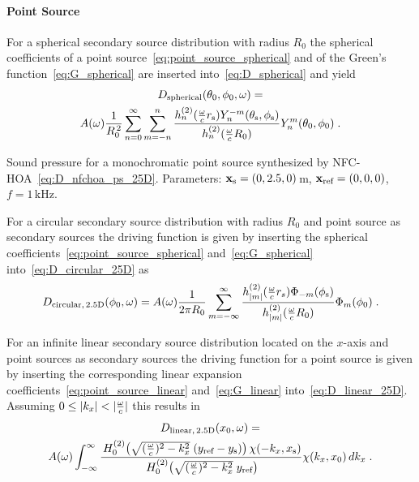 \paragraph{Point Source}
%
For a spherical secondary source distribution with radius $R_0$ the spherical
coefficients of a point source~\eqref{eq:point_source_spherical} and of the Green's
function~\eqref{eq:G_spherical} are inserted into~\eqref{eq:D_spherical} and yield
%
%
\begin{multline}
    D_\text{spherical}(\theta_0,\phi_0,\omega) = \\
    A(\omega) \frac{1}{R_0^{\,2}} \sum_{n=0}^\infty \sum_{m=-n}^n
    \frac{h_n^{(2)}(\omegac r_\text{s}) Y_n^{-m}(\theta_\text{s},\phi_\text{s})}
    {h_n^{(2)}(\omegac R_0)} Y_n^m (\theta_0,\phi_0) \qp
    \label{eq:D_nfchoa_ps_3D}
\end{multline}
%
\begin{marginfigure}
    \centering
    \ft
    
    \caption{Sound pressure for a monochromatic point source synthesized by
        \twohalfD \ac{NFC-HOA}~\eqref{eq:D_nfchoa_ps_25D}. Parameters: $\mathbf{x}_\text{s} =
        (0,2.5,0)$\,m, $\mathbf{x}_\text{ref} = (0,0,0)$, $f = 1$\,kHz.
        }
\end{marginfigure}
%
For a circular secondary source distribution with radius $R_0$ and point source
as secondary sources the \twohalfD driving function is given by inserting the
spherical coefficients~\eqref{eq:point_source_spherical} and~\eqref{eq:G_spherical}
into~\eqref{eq:D_circular_25D} as
%
\begin{equation}
    D_{\text{circular},\,\twohalfD}(\phi_0,\omega) = A(\omega) \frac{1}{2\pi R_0}
        \sum_{m=-\infty}^{\infty}
        \frac{h_{|m|}^{(2)} (\omegac r_s) \Phi_{-m}(\phi_\text{s})} 
        {h_{|m|}^{(2)} (\omegac R_0)} \Phi_m(\phi_0) \qp
    \label{eq:D_nfchoa_ps_25D}
\end{equation}
%

For an infinite linear secondary source distribution located on the $x$-axis and
point sources as secondary sources the \twohalfD driving function for a
point source is given by inserting the corresponding linear expansion
coefficients~\eqref{eq:point_source_linear} and~\eqref{eq:G_linear}
into~\eqref{eq:D_linear_25D}. Assuming
$0 \le |k_x| < |\frac{\omega}{c}|$ this results
in\autocite[Compare (4.53) in][]{Ahrens2012}
%
\begin{multline}
    D_{\text{linear},\,\twohalfD}(x_0,\omega) = \\
    A(\omega) \int_{-\infty}^\infty \frac{
    \H{0}{2}\left(\sqrt{(\omegac)^2-k_x^2} \; (y_\text{ref}-y_\text{s}) \right)
    \chi(-k_x,x_\text{s})} {\H{0}{2}\left(\sqrt{(\omegac)^2-k_x^2} \;
    y_\text{ref}\right)} \chi(k_x,x_0) \, dk_x \qp
    \label{eq:D_sdm_ps_25D}
\end{multline}
%



